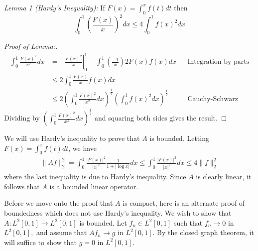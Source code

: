 \documentclass[answers]{exam}
\begin{document}
\begin{questions}
\begin{solution}
  \textit{Lemma 1 (Hardy's Inequality):} If $F(x)= \int_{0}^{x}f(t)dt$ then
  \begin{equation*}
    \int_{0}^{1}\left( \frac{F(x)}{x} \right)^{2}dx \leq 4 \int_{0}^{1}f(x)^2dx
  \end{equation*}
  \begin{proof}[Proof of Lemma:] 
    \begin{align*}
      \int_{0}^{1}\frac{F(x)^{2}}{x^{2}}dx
      &= - \left.\frac{F(x)^{2}}{x}\right|_{0}^{1} - \int_{0}^{1}\left( \frac{-1}{x} \right)2F(x)f(x)dx &&\text{Integration by parts}\\
      &\leq 2 \int_{0}^{1}\frac{F(x)}{x}f(x)dx\\
      &\leq 2 \left(  \int_{0}^{1}\frac{F(x)^{2}}{x^{2}}dx \right)^{\frac{1}{2}} \left( \int_{0}^{1}f(x)^{2}dx \right)^{\frac{1}{2}}&&\text{Cauchy-Schwarz}
    \end{align*}
    Dividing by $ \left(  \int_{0}^{1}\frac{F(x)^{2}}{x^{2}}dx \right)^{\frac{1}{2}}$ and squaring both sides gives the result.
  \end{proof}
  
  We will use Hardy's inequality to prove that $A$ is bounded. Letting $F(x) = \int_{0}^{x}f(t)dt$, we have
  \begin{align*}
    \| Af \|_{2}^{2} = \int_{0}^{1}\frac{|F(x)|^{2}}{|x|^{2}} \frac{1}{1+|\log x|}dx \leq \int_{0}^{1}\frac{|F(x)|^{2}}{|x|^{2}}dx \leq 4 \| f \|^{2}_{2}
  \end{align*}
  where the last inequality is due to Hardy's inequality. Since $A$ is clearly linear, it follows that $A$ is a bounded linear operator.
  
  Before we move onto the proof that $A$ is compact, here is an alternate proof of boundedness which does not use Hardy's inequality. We wish to show that $A:L^{2}[0,1]\to L^{2}[0,1]$ is
bounded. Let $f_{n}\in L^{2}[0,1]$ such that $f_{n}\to 0$ in $L^{2}[0,1],$ and
assume that $Af_{n}\to g$ in $L^{2}[0,1].$ By the closed graph theorem, it will
suffice to show that $g=0$ in $L^{2}[0,1].$  



\end{solution}
\end{questions}
\end{document}
